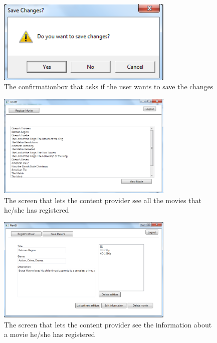 \begin{figure}[h!]
  \centering
    \includegraphics[width=0.75\textwidth]{Parts/Appendix/Images/Confirmationbox}
  \caption{The confirmationbox that asks if the user wants to save the changes}
  \label{fig:Appendix_GUI_PrototypeEditprofile}
\end{figure}

\begin{figure}[h!]
  \centering
    \includegraphics[width=0.75\textwidth]{Parts/Appendix/Images/CPmovielist}
  \caption{The screen that lets the content provider see all the movies that he/she has registered}
  \label{fig:Appendix_GUI_PrototypeCPMovielist}
\end{figure}

\begin{figure}[h!]
  \centering
    \includegraphics[width=0.75\textwidth]{Parts/Appendix/Images/CPViewmovie}
  \caption{The screen that lets the content provider see the information about a movie he/she has registered}
  \label{fig:Appendix_GUI_PrototypeCPViewmovie}
\end{figure}

